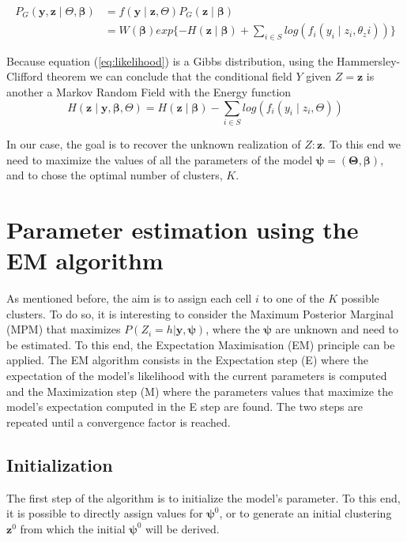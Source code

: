 \begin{align}
\label{eq:likelihood}
P_G(\boldsymbol{y},\boldsymbol{z} \mid \Theta, \boldsymbol{\beta}) &= f(\boldsymbol{y} \mid \boldsymbol{z}, \Theta)P_G(\boldsymbol{z} \mid \boldsymbol{\beta})\nonumber\\
&= W(\boldsymbol{\beta})exp\{{-H(\boldsymbol{z} \mid \boldsymbol{\beta})} + \sum\limits_{i \in S}log(f_i(y_i \mid z_i, \theta_zi))\}
\end{align}

Because equation (\ref{eq:likelihood}) is a Gibbs distribution, using the Hammersley-Clifford theorem we can conclude that the conditional field $Y$ given $Z =\boldsymbol{z}$ is another a Markov Random Field with the Energy function 
\[H(\boldsymbol{z} \mid \boldsymbol{y}, \boldsymbol{\beta}, \Theta) = H(\boldsymbol{z} \mid \boldsymbol{\beta}) - \sum\limits_{i \in S} log(f_i(y_i \mid z_i, \Theta))\]

In our case, the goal is to recover the unknown realization of $Z: \boldsymbol{z}$. To this end we need to maximize the values of all the parameters of the model $\boldsymbol{\psi} = (\boldsymbol{\Theta}, \boldsymbol{\beta})$, and to chose the optimal number of clusters, $K$.

\section{Parameter estimation using the EM algorithm}
As mentioned before, the aim is to assign each cell $i$ to one of the $K$ possible clusters. To do so, it is interesting to consider the Maximum Posterior Marginal (MPM) that maximizes $P(Z_{i}=h|\boldsymbol{y}, \boldsymbol{\psi})$, where the $\boldsymbol{\psi}$ are unknown and need to be estimated. To this end, the Expectation Maximisation \cite{dempster77} (EM) principle can be applied. The EM algorithm consists in the Expectation step (E) where the expectation of the model's likelihood with the current parameters is computed and the Maximization step (M) where the parameters values that maximize the model's expectation computed in the E step are found. The two steps are repeated until a convergence factor is reached.\\

	\subsection{Initialization}
The first step of the algorithm is to initialize the model's parameter. To this end, it is possible to directly assign values for $\boldsymbol{\psi}^{0}$, or to generate an initial clustering $\boldsymbol{z}^{0}$ from which the initial $\boldsymbol{\psi}^{0}$ will be derived.\\

